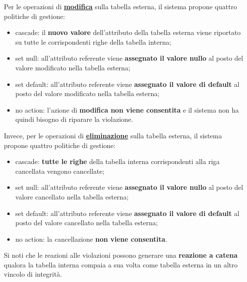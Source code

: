 \documentclass[a4paper]{article}
\begin{document}
	\noindent
	Per le operazioni di \textbf{\underline{modifica}} sulla tabella esterna, il sistema propone quattro politiche di gestione:
	\begin{itemize}
		\item \textcolor{Red3}{\textsf{cascade}}: il \textbf{nuovo valore} dell'attributo della tabella esterna viene riportato su tutte le corrispondenti righe della tabella interna;
		
		\item \textcolor{Red3}{\textsf{set null}}: all'attributo referente viene \textbf{assegnato il valore nullo} al posto del valore modificato nella tabella esterna;
		
		\item \textcolor{Red3}{\textsf{set default}}: all'attributo referente viene \textbf{assegnato il valore di default} al posto del valore modificato nella tabella esterna;
		
		\item \textcolor{Red3}{\textsf{no action}}: l'azione di \textbf{modifica non viene consentita} e il sistema non ha quindi bisogno di riparare la violazione.
	\end{itemize}
	Invece, per le operazioni di \textbf{\underline{eliminazione}} sulla tabella esterna, il sistema propone quattro politiche di gestione:
	\begin{itemize}
		\item \textcolor{Red3}{\textsf{cascade}}: \textbf{tutte le righe} della tabella interna corrispondenti alla riga cancellata vengono cancellate;
		
		\item \textcolor{Red3}{\textsf{set null}}: all'attributo referente viene \textbf{assegnato il valore nullo} al posto del valore cancellato nella tabella esterna;
		
		\item \textcolor{Red3}{\textsf{set default}}: all'attributo referente viene \textbf{assegnato il valore di default} al posto del valore cancellato nella tabella esterna;
		
		\item \textcolor{Red3}{\textsf{no action}}: la cancellazione \textbf{non viene consentita}.
	\end{itemize}\newpage

	\noindent
	Si noti che le reazioni alle violazioni possono generare una \textbf{reazione a catena} qualora la tabella interna compaia a sua volta come tabella esterna in un altro vincolo di integrità.\newline
	
\end{document}
